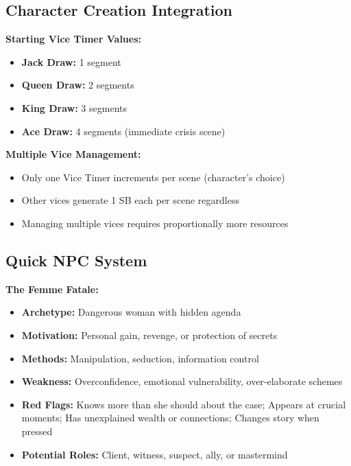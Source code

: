 \documentclass[11pt]{article}
\begin{document}
\subsection{Character Creation Integration}

\textbf{Starting Vice Timer Values:}
\begin{itemize}
    \item \textbf{Jack Draw:} 1 segment
    \item \textbf{Queen Draw:} 2 segments
    \item \textbf{King Draw:} 3 segments  
    \item \textbf{Ace Draw:} 4 segments (immediate crisis scene)
\end{itemize}

\textbf{Multiple Vice Management:}
\begin{itemize}
    \item Only one Vice Timer increments per scene (character's choice)
    \item Other vices generate 1 SB each per scene regardless
    \item Managing multiple vices requires proportionally more resources
\end{itemize}

\subsection{Quick NPC System}

\textbf{The Femme Fatale:}
\begin{itemize}
    \item \textbf{Archetype:} Dangerous woman with hidden agenda
    \item \textbf{Motivation:} Personal gain, revenge, or protection of secrets
    \item \textbf{Methods:} Manipulation, seduction, information control
    \item \textbf{Weakness:} Overconfidence, emotional vulnerability, over-elaborate schemes
    \item \textbf{Red Flags:} Knows more than she should about the case; Appears at crucial moments; Has unexplained wealth or connections; Changes story when pressed
    \item \textbf{Potential Roles:} Client, witness, suspect, ally, or mastermind
\end{itemize}
\end{document}
